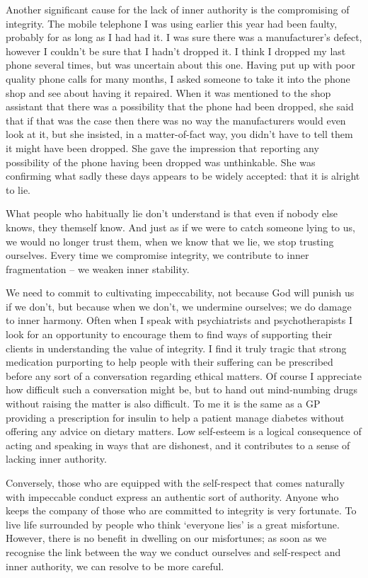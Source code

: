 Another significant cause for the lack of inner authority is the
compromising of integrity. The mobile telephone I was using earlier this
year had been faulty, probably for as long as I had had it. I was sure
there was a manufacturer's defect, however I couldn't be sure that I
hadn't dropped it. I think I dropped my last phone several times, but
was uncertain about this one. Having put up with poor quality phone
calls for many months, I asked someone to take it into the phone shop
and see about having it repaired. When it was mentioned to the shop
assistant that there was a possibility that the phone had been dropped,
she said that if that was the case then there was no way the
manufacturers would even look at it, but she insisted, in a
matter-of-fact way, you didn't have to tell them it might have been
dropped. She gave the impression that reporting any possibility of the
phone having been dropped was unthinkable. She was confirming what sadly
these days appears to be widely accepted: that it is alright to lie.

What people who habitually lie don't understand is that even if nobody
else knows, they themself know. And just as if we were to catch someone
lying to us, we would no longer trust them, when we know that we lie, we
stop trusting ourselves. Every time we compromise integrity, we
contribute to inner fragmentation -- we weaken inner stability.

We need to commit to cultivating impeccability, not because God will
punish us if we don't, but because when we don't, we undermine
ourselves; we do damage to inner harmony. Often when I speak with
psychiatrists and psychotherapists I look for an opportunity to
encourage them to find ways of supporting their clients in understanding
the value of integrity. I find it truly tragic that strong medication
purporting to help people with their suffering can be prescribed before
any sort of a conversation regarding ethical matters. Of course I
appreciate how difficult such a conversation might be, but to hand out
mind-numbing drugs without raising the matter is also difficult. To me
it is the same as a GP providing a prescription for insulin to help a
patient manage diabetes without offering any advice on dietary matters.
Low self-esteem is a logical consequence of acting and speaking in ways
that are dishonest, and it contributes to a sense of lacking inner
authority.

Conversely, those who are equipped with the self-respect that comes
naturally with impeccable conduct express an authentic sort of
authority. Anyone who keeps the company of those who are committed to
integrity is very fortunate. To live life surrounded by people who think
`everyone lies' is a great misfortune. However, there is no benefit in
dwelling on our misfortunes; as soon as we recognise the link between
the way we conduct ourselves and self-respect and inner authority, we
can resolve to be more careful.


